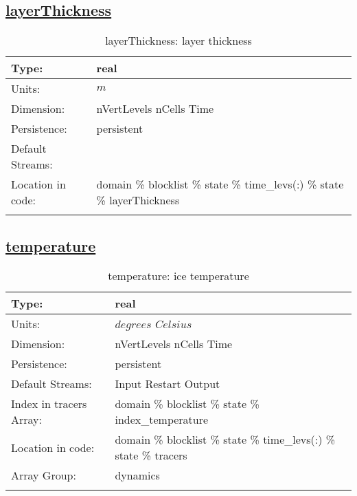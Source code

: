 \subsection[layerThickness]{\hyperref[sec:var_tab_state]{layerThickness}}
\label{subsec:var_sec_state_layerThickness}
\begin{center}
\begin{longtable}{| p{2.0in} | p{4.0in} |}
        \hline 
        Type: & real \\
        \hline 
        Units: & $m$ \\
        \hline 
        Dimension: & nVertLevels nCells Time \\
        \hline 
        Persistence: & persistent \\
        \hline 
		 Default Streams: &  \\
        \hline 
		 Location in code: & domain \% blocklist \% state \% time\_levs(:) \% state \% layerThickness \\
		 \hline 
    \caption{layerThickness: layer thickness}
\end{longtable}
\end{center}
\subsection[temperature]{\hyperref[sec:var_tab_state]{temperature}}
\label{subsec:var_sec_state_temperature}
\begin{center}
\begin{longtable}{| p{2.0in} | p{4.0in} |}
        \hline 
        Type: & real \\
        \hline 
        Units: & $degrees$ $Celsius$ \\
        \hline 
        Dimension: & nVertLevels nCells Time \\
        \hline 
        Persistence: & persistent \\
        \hline 
		 Default Streams: & Input Restart Output  \\
        \hline 
		 Index in tracers Array: & domain \% blocklist \% state \% index\_temperature \\
		 \hline 
		 Location in code: & domain \% blocklist \% state \% time\_levs(:) \% state \% tracers \\
		 \hline 
		 Array Group: & dynamics \\
		 \hline 
    \caption{temperature: ice temperature}
\end{longtable}
\end{center}
